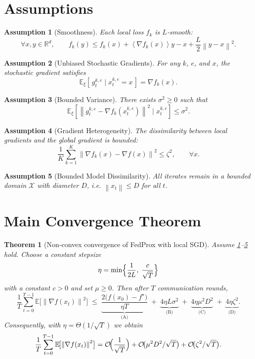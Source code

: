 \documentclass{article}
\newtheorem{theorem}{Theorem}
\newtheorem{assumption}{Assumption}
\newcommand{\E}{\mathbb{E}}
\newcommand{\norm}[1]{\left\|#1\right\|}
\newcommand{\inner}[1]{\left\langle #1 \right\rangle}
\begin{document}
\newpage
\section*{Assumptions}
\begin{assumption}[Smoothness]\label{ass:smooth}
Each local loss $f_k$ is $L$‑smooth:
\[
\forall x,y\in\mathbb{R}^d,\qquad
f_k(y)\le f_k(x)+\inner{\nabla f_k(x)}{y-x}+\frac{L}{2}\norm{y-x}^2 .
\]
\end{assumption}

\begin{assumption}[Unbiased Stochastic Gradients]\label{ass:unbiased}
For any $k$, $e$, and $x$, the stochastic gradient satisfies
\[
\E_{\xi}[\,g_{t}^{k,e}\mid x_{t}^{k,e}=x\,]=\nabla f_k(x).
\]
\end{assumption}

\begin{assumption}[Bounded Variance]\label{ass:variance}
There exists $\sigma^2\ge0$ such that
\[
\E_{\xi}\!\left[\norm{g_{t}^{k,e}-\nabla f_k(x_{t}^{k,e})}^2\mid x_{t}^{k,e}\right]\le\sigma^2 .
\]
\end{assumption}

\begin{assumption}[Gradient Heterogeneity]\label{ass:hetero}
The dissimilarity between local gradients and the global gradient is bounded:
\[
\frac1K\sum_{k=1}^K \norm{\nabla f_k(x)-\nabla f(x)}^2 \le \zeta^2,\qquad\forall x .
\]
\end{assumption}

\begin{assumption}[Bounded Model Dissimilarity]\label{ass:bounded}
All iterates remain in a bounded domain $\mathcal{X}$ with diameter $D$, i.e.
$\norm{x_t}\le D$ for all $t$.
\end{assumption}

\section*{Main Convergence Theorem}
\begin{theorem}[Non‑convex convergence of FedProx with local SGD]\label{thm:main}
Assume \ref{ass:smooth}–\ref{ass:bounded} hold.
Choose a constant stepsize 
\[
\eta = \min\Bigl\{\frac{1}{2L}, \; \frac{c}{\sqrt{T}}\Bigr\}
\]
with a constant $c>0$ and set $\mu\ge0$.
Then after $T$ communication rounds,
\[
\frac1T\sum_{t=0}^{T-1}\E\!\bigl[\norm{\nabla f(x_t)}^2\bigr]
\;\le\;
\underbrace{\frac{2\bigl(f(x_0)-f^\star\bigr)}{\eta T}}_{\text{(A)}}
\;+\;
\underbrace{4\eta L\sigma^2}_{\text{(B)}}
\;+\;
\underbrace{4\eta \mu^2 D^2}_{\text{(C)}}
\;+\;
\underbrace{4\eta \zeta^2}_{\text{(D)}} .
\]
Consequently, with $\eta = \Theta(1/\sqrt{T})$ we obtain
\[
\frac1T\sum_{t=0}^{T-1}\E\!\bigl[\norm{\nabla f(x_t)}^2\bigr]=
\mathcal{O}\!\Bigl(\frac{1}{\sqrt{T}}\Bigr)
+ \mathcal{O}\!\bigl(\mu^2 D^2/\sqrt{T}\bigr)
+ \mathcal{O}\!\bigl(\zeta^2/\sqrt{T}\bigr).
\]
\end{theorem}
\end{document}

